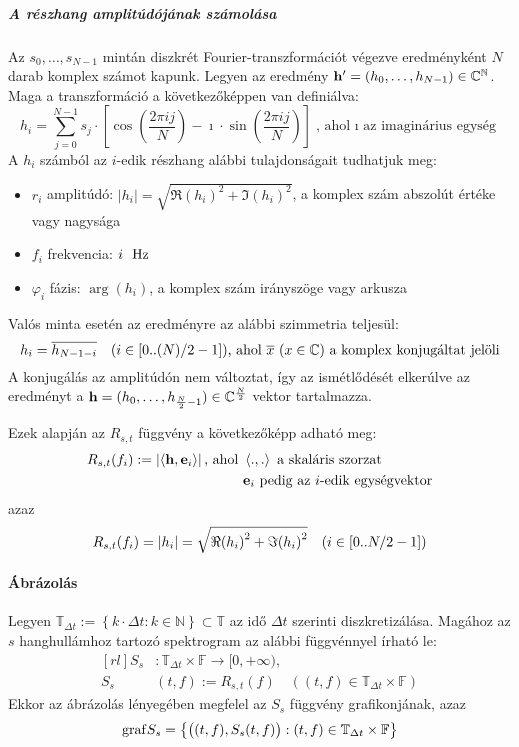 \subparagraph{A r\'eszhang amplit\'ud\'oj\'anak sz\'amol\'asa}
Az $s_0,\dots,s_{N-1}$ mint\'an diszkr\'et Fourier-transzform\'aci\'ot v\'egezve eredm\'enyk\'ent $N$ darab komplex sz\'amot kapunk. Legyen az eredm\'eny $ \mathbf{h'}=(h_0,\dots,h_{N-1})\in\mathbb{C^N}$. \newline
Maga a transzform\'aci\'o a k\"ovetkez\H ok\'eppen van defini\'alva:
\[
h_i = \sum_{j=0}^{N-1} s_j \cdot \left[ \cos\left( \frac{2\pi i j}{N} \right) - \imath\cdot\sin\left( \frac{2\pi i j}{N} \right) \right] \text{, ahol $\imath$ az imagin\'arius egys\'eg}
\]
A $h_i$ sz\'amb\'ol az $i$-edik r\'eszhang al\'abbi tulajdons\'agait tudhatjuk meg:
\begin{itemize}
	\item $r_i$ amplit\'ud\'o: $|h_i|=\sqrt{\Re{(h_i)}^2 + \Im{(h_i)}^2}$, a komplex sz\'am abszol\'ut \'ert\'eke vagy nagys\'aga
	\item $f_i$ frekvencia: $i\ \ \mathrm{Hz}$ 
	\item $\varphi_i$ f\'azis: $\arg (h_i)$, a komplex sz\'am ir\'anysz\"oge vagy arkusza
\end{itemize}

Val\'os minta eset\'en az eredm\'enyre az al\'abbi szimmetria teljes\"ul:
\[
h_i = \conj{h_{N-1-i}} \quad (i\in\left[0..\infrac{(N)}{2}-1\right])\text{, ahol $\conj{x}\ (x\in\mathbb C)$ a komplex konjug\'altat jel\"oli}
\]
A konjug\'al\'as az amplit\'ud\'on nem v\'altoztat, \'igy az ism\'etl\H od\'es\'et elker\'ulve az eredm\'enyt a $\mathbf{h}=(h_0,\dots,h_{\frac{N}{2}-1})\in\mathbb{C}^{\frac{N}{2}}$ vektor tartalmazza.

Ezek alapj\'an az $R_{s,t}$ f\"uggv\'eny a k\"ovetkez\H ok\'epp adhat\'o meg:
\[ \begin{aligned}
R_{s,t}(f_i):=\left| \left<\mathbf{h},\mathbf{e}_i\right> \right|
\text{, ahol}\  & \left<.,.\right>\text{ a skal\'aris szorzat} \\
& \mathbf{e}_i\text{ pedig az $i$-edik egys\'egvektor}
\end{aligned}
\]
azaz
\[ R_{s,t}(f_i) = |h_i| = \sqrt{\Re{(h_i)}^2 + \Im{(h_i)}^2}
\quad (i\in [0..N/2-1]) \]


\paragraph{\'Abr\'azol\'as}
Legyen $\mathbb{T}_{\Delta t}:=\left\{ k\cdot\Delta t : k\in\mathbb{N} \right\} \subset \mathbb{T}$ az id\H o $\Delta t$ szerinti diszkretiz\'al\'asa. \newline
Mag\'ahoz az $s$ hanghull\'amhoz tartoz\'o spektrogram az al\'abbi f\"uggv\'ennyel \'irhat\'o le:
\[ \begin{aligned}[rl]
S_s&:\mathbb{T}_{\Delta t}\times\mathbb{F} \rightarrow [0,+\infty), \\
S_s&(t,f):=R_{s,t}(f) \quad \left( (t,f)\in \mathbb{T}_{\Delta t}\times\mathbb{F} \right)
\end{aligned}
\]
Ekkor az \'abr\'azol\'as l\'enyeg\'eben megfelel az $S_s$ f\"uggv\'eny grafikonj\'anak, azaz
\[
\mathrm{graf} S_s = \left\{ \big( (t,f) ,S_s(t,f) \big) : (t,f)\in \mathbb{T}_{\Delta t}\times\mathbb{F} \right\}
\]

